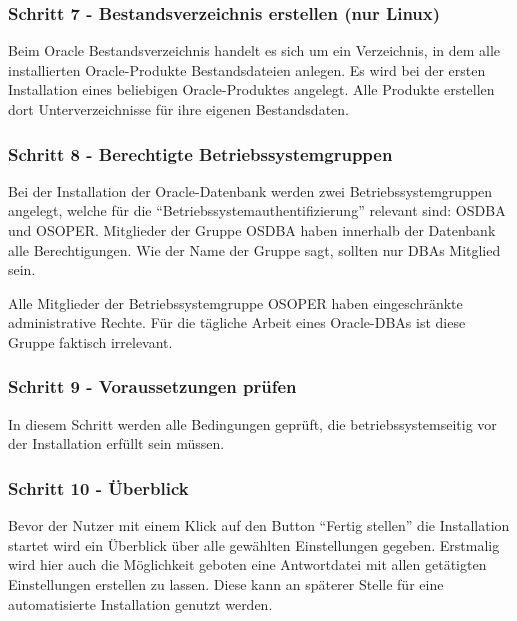         \subsubsection{Schritt 7 - Bestandsverzeichnis erstellen (nur Linux)}
          Beim Oracle Bestandsverzeichnis handelt es sich um ein Verzeichnis, in dem alle installierten Oracle-Produkte Bestandsdateien anlegen. Es wird bei der ersten Installation eines beliebigen Oracle-Produktes angelegt. Alle Produkte erstellen dort Unterverzeichnisse für ihre eigenen Bestandsdaten.
        \subsubsection{Schritt 8 - Berechtigte Betriebssystemgruppen}
          Bei der Installation der Oracle-Datenbank werden zwei Betriebssystemgruppen angelegt, welche für die \enquote{Betriebssystemauthentifizierung} relevant sind: OSDBA und OSOPER. Mitglieder der Gruppe OSDBA haben innerhalb der Datenbank alle Berechtigungen. Wie der Name der Gruppe sagt, sollten nur DBAs Mitglied sein.

          Alle Mitglieder der Betriebssystemgruppe OSOPER haben eingeschränkte administrative Rechte. Für die tägliche Arbeit eines Oracle-DBAs ist diese Gruppe faktisch irrelevant.
		  
        \subsubsection{Schritt 9 - Voraussetzungen prüfen}
          In diesem Schritt werden alle Bedingungen geprüft, die betriebssystemseitig vor der Installation erfüllt sein müssen.
        \subsubsection{Schritt 10 - Überblick}
          Bevor der Nutzer mit einem Klick auf den Button \enquote{Fertig stellen} die Installation startet wird ein Überblick über alle gewählten Einstellungen gegeben. Erstmalig wird hier auch die Möglichkeit geboten eine Antwortdatei mit allen getätigten Einstellungen erstellen zu lassen. Diese kann an späterer Stelle für eine automatisierte Installation genutzt werden.
\clearpage		  
